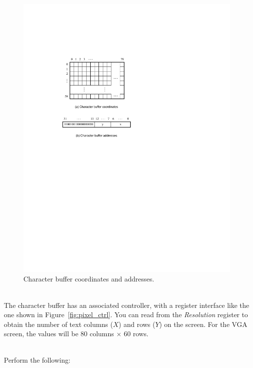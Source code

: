 \documentclass[epsfig,10pt,fullpage]{article}
\begin{document}
\begin{figure}[h]
   \begin{center}
       \includegraphics{figures/fig_chars.pdf}
   \end{center}
   \caption{Character buffer coordinates and addresses.}
	\label{fig:chars}
\end{figure}

~\\
\noindent
The character buffer has an associated controller, with a
register interface like the one shown in Figure~\ref{fig:pixel_ctrl}. You can read from the
{\it Resolution} register to obtain the number of text columns ($X$) and rows ($Y$) on
the screen. For the VGA screen, the values will be 80 columns $\times$ 60 rows.

~\\
\noindent
Perform the following:
\end{document}
